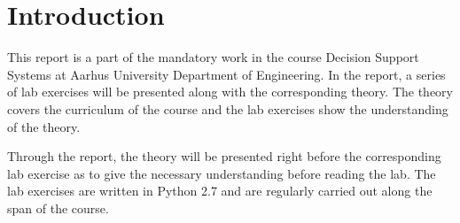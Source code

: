 \chapter{Introduction}
\label{chp:intro}

This report is a part of the mandatory work in the course Decision Support Systems at Aarhus University Department of Engineering.
In the report, a series of lab exercises will be presented along with the corresponding theory. 
The theory covers the curriculum of the course and the lab exercises show the understanding of the theory. 

Through the report, the theory will be presented right before the corresponding lab exercise as to give the necessary understanding before reading the lab. The lab exercises are written in Python 2.7 and are regularly carried out along the span of the course. 